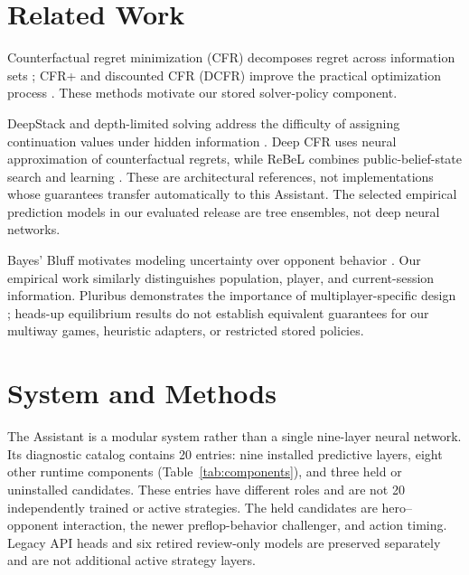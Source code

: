 \documentclass[11pt]{article}
\begin{document}
\section{Related Work}
Counterfactual regret minimization (CFR) decomposes regret across information sets \citep{zinkevich2007}; CFR+ and discounted CFR (DCFR) improve the practical optimization process \citep{tammelin2014,brown2019dcfr}. These methods motivate our stored solver-policy component.

DeepStack and depth-limited solving address the difficulty of assigning continuation values under hidden information \citep{moravcik2017,brown2018depth}. Deep CFR uses neural approximation of counterfactual regrets, while ReBeL combines public-belief-state search and learning \citep{brown2019deep,brown2020rebel}. These are architectural references, not implementations whose guarantees transfer automatically to this Assistant. The selected empirical prediction models in our evaluated release are tree ensembles, not deep neural networks.

Bayes' Bluff motivates modeling uncertainty over opponent behavior \citep{southey2005}. Our empirical work similarly distinguishes population, player, and current-session information. Pluribus demonstrates the importance of multiplayer-specific design \citep{brown2019pluribus}; heads-up equilibrium results do not establish equivalent guarantees for our multiway games, heuristic adapters, or restricted stored policies.

\section{System and Methods}
The Assistant is a modular system rather than a single nine-layer neural network. Its diagnostic catalog contains 20 entries: nine installed predictive layers, eight other runtime components (Table~\ref{tab:components}), and three held or uninstalled candidates. These entries have different roles and are not 20 independently trained or active strategies. The held candidates are hero--opponent interaction, the newer preflop-behavior challenger, and action timing. Legacy API heads and six retired review-only models are preserved separately and are not additional active strategy layers.
\end{document}
